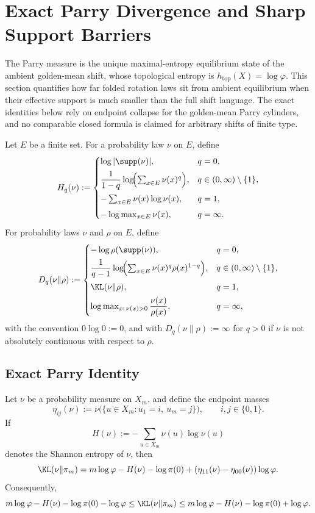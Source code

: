 \section{Exact Parry Divergence and Sharp Support Barriers}
\label{sec:parry-divergence}

The Parry measure is the unique maximal-entropy equilibrium state of the
ambient golden-mean shift, whose topological entropy is
\(h_{\mathrm{top}}(X)=\log\varphi\). This section quantifies how far
folded rotation laws sit from ambient equilibrium when their effective support
is much smaller than the full shift language. The exact identities below rely
on endpoint collapse for the golden-mean Parry cylinders, and no comparable
closed formula is claimed for arbitrary shifts of finite type.

\begin{definition}\label{def:renyi-entropy-divergence}
Let \(E\) be a finite set. For a probability law \(\nu\) on \(E\), define
\[
H_q(\nu):=
\begin{cases}
\log |\supp(\nu)|,
& q=0,\\[0.4em]
\dfrac{1}{1-q}\log\!\Bigl(\sum_{x\in E}\nu(x)^q\Bigr),
& q\in(0,\infty)\setminus\{1\},\\[0.8em]
-\sum_{x\in E}\nu(x)\log \nu(x),
& q=1,\\[0.4em]
-\log \max_{x\in E}\nu(x),
& q=\infty.
\end{cases}
\]
For probability laws \(\nu\) and \(\rho\) on \(E\), define
\[
D_q(\nu\|\rho):=
\begin{cases}
-\log \rho(\supp(\nu)),
& q=0,\\[0.4em]
\dfrac{1}{q-1}\log\!\Bigl(\sum_{x\in E}\nu(x)^q\rho(x)^{1-q}\Bigr),
& q\in(0,\infty)\setminus\{1\},\\[0.8em]
\KL(\nu\|\rho),
& q=1,\\[0.4em]
\log \max_{x:\,\nu(x)>0}\dfrac{\nu(x)}{\rho(x)},
& q=\infty,
\end{cases}
\]
with the convention \(0\log 0:=0\), and with \(D_q(\nu\|\rho):=\infty\) for
\(q>0\) if \(\nu\) is not absolutely continuous with respect to \(\rho\).
\end{definition}

\subsection{Exact Parry Identity}

\begin{theorem}\label{thm:parry-kl-identity}
Let \(\nu\) be a probability measure on \(X_m\), and define the endpoint masses
\[
\eta_{ij}(\nu):=\nu\bigl(\{u\in X_m:u_1=i,\ u_m=j\}\bigr),
\qquad i,j\in\{0,1\}.
\]
If
\[
H(\nu):=-\sum_{u\in X_m}\nu(u)\log \nu(u)
\]
denotes the Shannon entropy of \(\nu\), then
\[
\KL(\nu\|\pi_m)
=
m\log\varphi-H(\nu)-\log\pi(0)
{}+(\eta_{11}(\nu)-\eta_{00}(\nu))\log\varphi.
\]
Consequently,
\[
m\log\varphi-H(\nu)-\log\pi(0)-\log\varphi
\le
\KL(\nu\|\pi_m)
\le
m\log\varphi-H(\nu)-\log\pi(0)+\log\varphi.
\]
\end{theorem}

